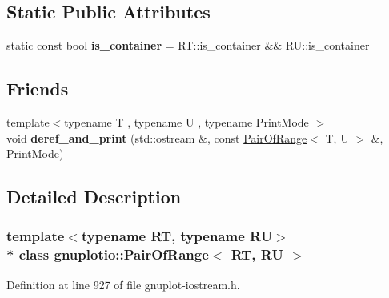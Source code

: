 \subsection*{Static Public Attributes}
\begin{DoxyCompactItemize}
\item 
static const bool {\bfseries is\+\_\+container} = R\+T\+::is\+\_\+container \&\& R\+U\+::is\+\_\+container\hypertarget{classgnuplotio_1_1_pair_of_range_ab49c6567f0fa6a82fa2a6245fd964659}{}\label{classgnuplotio_1_1_pair_of_range_ab49c6567f0fa6a82fa2a6245fd964659}

\end{DoxyCompactItemize}
\subsection*{Friends}
\begin{DoxyCompactItemize}
\item 
{\footnotesize template$<$typename T , typename U , typename Print\+Mode $>$ }\\void {\bfseries deref\+\_\+and\+\_\+print} (std\+::ostream \&, const \hyperlink{classgnuplotio_1_1_pair_of_range}{Pair\+Of\+Range}$<$ T, U $>$ \&, Print\+Mode)\hypertarget{classgnuplotio_1_1_pair_of_range_aada62f803432f04aff66f3c609329520}{}\label{classgnuplotio_1_1_pair_of_range_aada62f803432f04aff66f3c609329520}

\end{DoxyCompactItemize}


\subsection{Detailed Description}
\subsubsection*{template$<$typename RT, typename RU$>$\\*
class gnuplotio\+::\+Pair\+Of\+Range$<$ R\+T, R\+U $>$}



Definition at line 927 of file gnuplot-\/iostream.\+h.

